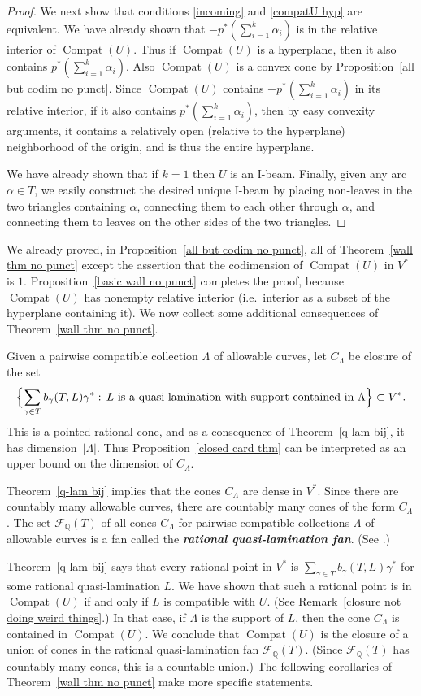 \documentclass{amsart}
\theoremstyle{definition}
\theoremstyle{remark}
\numberwithin{equation}{section}
\newcommand{\newword}[1]{\textbf{\emph{#1}}}
\newcommand{\rationals}{\mathbb Q}
\newcommand{\settt}[1]{{\Bigl\lbrace #1 \Bigr\rbrace}}
\newcommand{\F}{{\mathcal F}}
\newcommand{\0}{{\mathbf{0}}}
\newcommand{\Compat}{\operatorname{Compat}}
\begin{document}
\begin{proof}
We next show that conditions \eqref{incoming} and \eqref{compatU hyp} are equivalent.
We have already shown that $-p^*(\sum_{i=1}^k\alpha_i)$ is in the relative interior of $\Compat(U)$.
Thus if $\Compat(U)$ is a hyperplane, then it also contains $p^*(\sum_{i=1}^k\alpha_i)$.
Also $\Compat(U)$ is a convex cone by Proposition~\ref{all but codim no punct}.
Since $\Compat(U)$ contains $-p^*(\sum_{i=1}^k\alpha_i)$ in its relative interior, if it also contains $p^*(\sum_{i=1}^k\alpha_i)$, then by easy convexity arguments, it contains a relatively open (relative to the hyperplane) neighborhood of the origin, and is thus the entire hyperplane.

We have already shown that if $k=1$ then $U$ is an I-beam.
Finally, given any arc $\alpha\in T$, we easily construct the desired unique I-beam by placing non-leaves in the two triangles containing $\alpha$, connecting them to each other through $\alpha$, and connecting them to leaves on the other sides of the two triangles.
\end{proof}

We already proved, in Proposition~\ref{all but codim no punct}, all of Theorem~\ref{wall thm no punct} except the assertion that the codimension of $\Compat(U)$ in $V^*$ is $1$.
Proposition~\ref{basic wall no punct} completes the proof, because $\Compat(U)$ has nonempty relative interior (i.e.\ interior as a subset of the hyperplane containing it).
We now collect some additional consequences of Theorem~\ref{wall thm no punct}.

Given a pairwise compatible collection $\Lambda$ of allowable curves, let $C_\Lambda$ be closure of the set
\[\settt{\sum_{\gamma\in T}b_\gamma(T,L)\gamma^*:\,L\text{ is a quasi-lamination with support contained in }\Lambda}\subset V^*.\]
This is a pointed rational cone, and as a consequence of Theorem~\ref{q-lam bij}, it has dimension~$|\Lambda|$.
Thus Proposition~\ref{closed card thm} can be interpreted as an upper bound on the dimension of $C_\Lambda$.

Theorem~\ref{q-lam bij} implies that the cones $C_\Lambda$ are dense in $V^*$.
Since there are countably many allowable curves, there are countably many cones of the form $C_\Lambda$.
The set $\F_\rationals(T)$ of all cones $C_\Lambda$ for pairwise compatible collections $\Lambda$ of allowable curves is a fan called the \newword{rational quasi-lamination fan}.
(See \cite[Section~4]{unisurface}.)

Theorem~\ref{q-lam bij} says that every rational point in $V^*$ is $\sum_{\gamma\in T}b_\gamma(T,L)\gamma^*$ for some rational quasi-lamination $L$.
We have shown that such a rational point is in $\Compat(U)$ if and only if $L$ is compatible with $U$.
(See Remark~\ref{closure not doing weird things}.)
In that case, if $\Lambda$ is the support of $L$, then the cone $C_\Lambda$ is contained in $\Compat(U)$.
We conclude that $\Compat(U)$ is the closure of a union of cones in the rational quasi-lamination fan $\F_\rationals(T)$.
(Since $\F_\rationals(T)$ has countably many cones, this is a countable union.)
The following corollaries of Theorem~\ref{wall thm no punct} make more specific statements.
\end{document}

